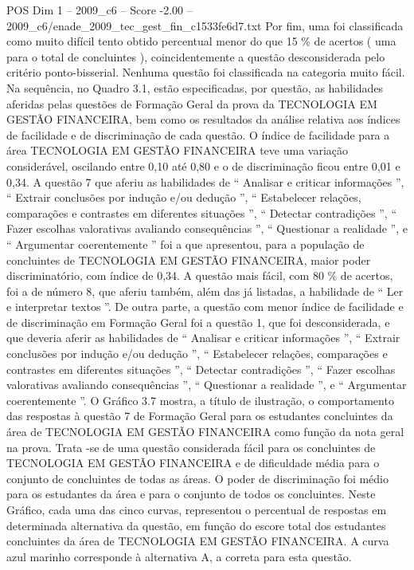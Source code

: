 \begin{textsample}{POS Dim 1 – 2009\_c6 – Score -2.00 – 2009\_c6/enade\_2009\_tec\_gest\_fin\_c1533fe6d7.txt}
Por fim, uma foi classificada como muito difícil tento obtido percentual menor do que 15 \% de acertos ( uma para o total de concluintes ), coincidentemente a questão desconsiderada pelo critério ponto-bisserial.
Nenhuma questão foi classificada na categoria muito fácil.
Na sequência, no Quadro 3.1, estão especificadas, por questão, as habilidades aferidas pelas questões de Formação Geral da prova da TECNOLOGIA EM GESTÃO FINANCEIRA, bem como os resultados da análise relativa aos índices de facilidade e de discriminação de cada questão.
O índice de facilidade para a área TECNOLOGIA EM GESTÃO FINANCEIRA teve uma variação considerável, oscilando entre 0,10 até 0,80 e o de discriminação ficou entre 0,01 e 0,34.
A questão 7 que aferiu as habilidades de “ Analisar e criticar informações ”, “ Extrair conclusões por indução e/ou dedução ”, “ Estabelecer relações, comparações e contrastes em diferentes situações ”, “ Detectar contradições ”, “ Fazer escolhas valorativas avaliando consequências ”, “ Questionar a realidade ”, e “ Argumentar coerentemente ” foi a que apresentou, para a população de concluintes de TECNOLOGIA EM GESTÃO FINANCEIRA, maior poder discriminatório, com índice de 0,34.
A questão mais fácil, com 80 \% de acertos, foi a de número 8, que aferiu também, além das já listadas, a habilidade de “ Ler e interpretar textos ”.
De outra parte, a questão com menor índice de facilidade e de discriminação em Formação Geral foi a questão 1, que foi desconsiderada, e que deveria aferir as habilidades de “ Analisar e criticar informações ”, “ Extrair conclusões por indução e/ou dedução ”, “ Estabelecer relações, comparações e contrastes em diferentes situações ”, “ Detectar contradições ”, “ Fazer escolhas valorativas avaliando consequências ”, “ Questionar a realidade ”, e “ Argumentar coerentemente ”.
O Gráfico 3.7 mostra, a título de ilustração, o comportamento das respostas à questão 7 de Formação Geral para os estudantes concluintes da área de TECNOLOGIA EM GESTÃO FINANCEIRA como função da nota geral na prova.
Trata -se de uma questão considerada fácil para os concluintes de TECNOLOGIA EM GESTÃO FINANCEIRA e de dificuldade média para o conjunto de concluintes de todas as áreas.
O poder de discriminação foi médio para os estudantes da área e para o conjunto de todos os concluintes.
Neste Gráfico, cada uma das cinco curvas, representou o percentual de respostas em determinada alternativa da questão, em função do escore total dos estudantes concluintes da área de TECNOLOGIA EM GESTÃO FINANCEIRA.
A curva azul marinho corresponde à alternativa A, a correta para esta questão.

\end{textsample}
